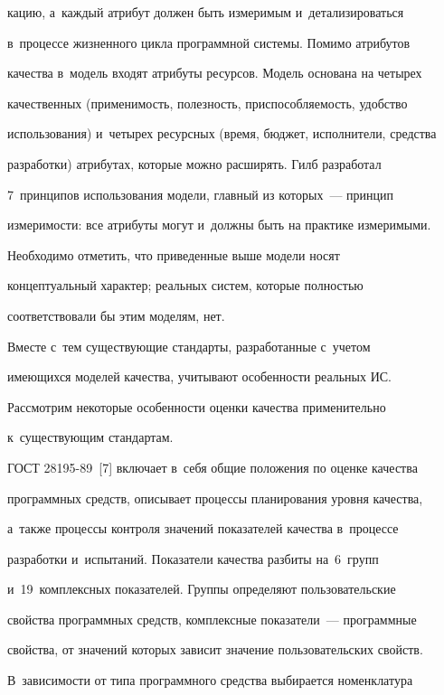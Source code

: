 кацию, а~каж\-дый атрибут должен быть измеримым и~детализироваться 

в~процессе жизненного цик\-ла программной сис\-те\-мы. Помимо атрибутов 

качества в~модель входят атрибуты ресурсов. Модель основана на четырех 

качественных (при\-ме\-ни\-мость, по\-лез\-ность, при\-спо\-соб\-ля\-емость, удобство 

использования) и~четырех ре\-сурс\-ных (время, бюджет, исполнители, средства 

разработки) атрибутах, которые можно расширять. Гилб разработал 

7~принципов использования модели, глав\-ный из которых~--- принцип 

из\-ме\-ри\-мости: все атрибуты могут и~долж\-ны быть на практике измеримыми. 

     

     Необходимо отметить, что приведенные выше модели носят 

концептуальный характер; реальных сис\-тем, которые пол\-ностью 

соответствовали бы этим моделям, нет. 


     Вместе с~тем существующие стандарты, разработанные с~учетом 

имеющихся моделей качества, учитывают особенности реальных ИС. 

     

     Рассмотрим некоторые особенности оценки качества применительно 

к~существующим стандартам. 

     

     ГОСТ 28195-89~[7] включает в~себя общие положения по оценке качества 

программных средств, описывает процессы планирования уровня качества, 

а~так\-же процессы контроля значений показателей качества в~процессе 

разработки и~испытаний. Показатели качества разбиты на~6~групп 

и~19~комплексных показателей. Группы определяют пользовательские 

свойства программных средств, комплексные показатели~--- программные 

свойства, от значений которых зависит значение пользовательских свойств. 

В~зависимости от типа программного средства выбирается номенклатура 

